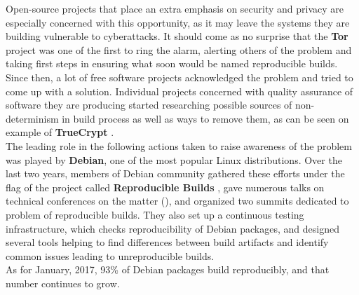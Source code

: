 {Open-source projects that place an extra emphasis on security
and privacy are especially concerned with this opportunity, as
it may leave the systems they are building vulnerable to cyberattacks.
It should come as no surprise that the \textbf{Tor} project was one of the
first to ring the alarm, alerting others of the problem and taking first steps
in ensuring what soon would be named reproducible builds\cite{tor13, tor14}.\\
Since then, a lot of free software projects acknowledged the problem and
tried to come up with a solution. Individual projects concerned with quality 
assurance of software they are producing started researching possible sources of 
non-determinism in build process as well as ways to remove them, as can be 
seen on example of \textbf{TrueCrypt} \cite{de2014challenges}.\\
The leading role in the following actions taken to raise awareness of the 
problem was played by \textbf{Debian}, one of the most popular Linux distributions.
Over the last two years, members of Debian community gathered these efforts
under the flag of the project called \textbf{Reproducible Builds} \cite{Rb}, 
gave numerous talks on technical conferences on the matter 
(\citep{Lun14, MiniDebConfCambridge2016, lca2017_valerie}), and organized
two summits dedicated to problem of reproducible builds. They also set up a continuous 
testing infrastructure\cite{tests-rbo}, which checks reproducibility
of Debian packages, and designed several tools helping to find 
differences between build artifacts and identify common issues leading to
unreproducible builds. \\
As for January, 2017, 93\% of Debian packages
build reproducibly, and that number continues to grow\cite{tests-rbo}.\\}
